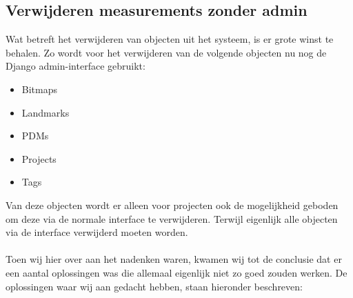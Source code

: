 \subsection{Verwijderen measurements zonder admin}
Wat betreft het verwijderen van objecten uit het systeem, is er grote winst te behalen.
Zo wordt voor het verwijderen van de volgende objecten nu nog de Django admin-interface gebruikt:
\begin{itemize}
  \item Bitmaps
  \item Landmarks
  \item PDMs
  \item Projects
  \item Tags
\end{itemize}
Van deze objecten wordt er alleen voor projecten ook de mogelijkheid geboden om deze via de normale interface te verwijderen. 
Terwijl eigenlijk alle objecten via de interface verwijderd moeten worden.
\\
\\
Toen wij hier over aan het nadenken waren, kwamen wij tot de conclusie dat er een aantal oplossingen was die allemaal eigenlijk niet zo goed zouden werken.
De oplossingen waar wij aan gedacht hebben, staan hieronder beschreven:
\\
